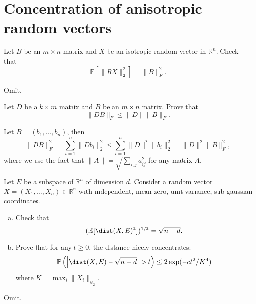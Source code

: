 \section{Concentration of anisotropic random vectors}
\begin{problem*}[Exercise 6.3.1]\label{ex6.3.1}
	Let \(B\) be an \(m \times n\) matrix and \(X\) be an isotropic random vector in \(\mathbb{R} ^n\). Check that
	\[
		\mathbb{E}_{}[\lVert BX \rVert _2^2]
		= \lVert B \rVert _F^2.
	\]
\end{problem*}
\begin{answer}
	Omit.
\end{answer}

\begin{problem*}[Exercise 6.3.3]\label{ex6.3.3}
	Let \(D\) be a \(k \times m\) matrix and \(B\) be an \(m \times n\) matrix. Prove that
	\[
		\lVert DB \rVert _F
		\leq \lVert D \rVert \lVert B \rVert _F.
	\]
\end{problem*}
\begin{answer}
	Let \(B = (b_1, \dots , b_n)\), then
	\[
		\lVert DB \rVert _F^2
		= \sum_{i=1}^{n} \lVert D b_i \rVert _2^2
		\leq \sum_{i=1}^{n} \lVert D \rVert ^2 \lVert b_i \rVert _2^2
		= \lVert D \rVert ^2 \lVert B \rVert _F^2,
	\]
	where we use the fact that \(\lVert A \rVert = \sqrt{\sum_{i, j} a_{ij}^2} \) for any matrix \(A\).
\end{answer}

\begin{problem*}[Exercise 6.3.4]\label{ex6.3.4}
	Let \(E\) be a subspace of \(\mathbb{R} ^n\) of dimension \(d\). Consider a random vector \(X = (X_1, \dots , X_n) \in \mathbb{R} ^n\) with independent, mean zero, unit variance, sub-gaussian coordinates.
	\begin{enumerate}[(a)]
		\item\label{ex6.3.4:a} Check that
		      \[
			      (\mathbb{E}_{}[\dist(X, E)^2] )^{1 / 2}
			      = \sqrt{n - d} .
		      \]
		\item\label{ex6.3.4:b} Prove that for any \(t \geq 0\), the distance nicely concentrates:
		      \[
			      \mathbb{P} \left( \left\lvert \dist(X, E) - \sqrt{n - d} \right\rvert > t \right)
			      \leq 2 \exp (-ct^2 / K^4)
		      \]
		      where \(K = \max _i \lVert X_i \rVert _{\psi _2}\).
	\end{enumerate}
\end{problem*}
\begin{answer}
	Omit.
\end{answer}

